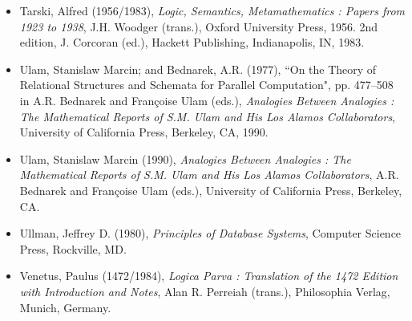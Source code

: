 \documentclass[12pt]{article}
\begin{document}
\begin{itemize}
\item
Tarski, Alfred (1956/1983), \textit{Logic, Semantics, Metamathematics : Papers from 1923 to 1938}, J.H. Woodger (trans.), Oxford University Press, 1956.  2nd edition, J. Corcoran (ed.), Hackett Publishing, Indianapolis, IN, 1983.
\item
Ulam, Stanislaw Marcin; and Bednarek, A.R. (1977), ``On the Theory of Relational Structures and Schemata for Parallel Computation", pp. 477--508 in A.R. Bednarek and Fran\c{c}oise Ulam (eds.), \textit{Analogies Between Analogies : The Mathematical Reports of S.M. Ulam and His Los Alamos Collaborators}, University of California Press, Berkeley, CA, 1990.
\item
Ulam, Stanislaw Marcin (1990), \textit{Analogies Between Analogies : The Mathematical Reports of S.M. Ulam and His Los Alamos Collaborators}, A.R. Bednarek and Fran\c{c}oise Ulam (eds.), University of California Press, Berkeley, CA.
\item
Ullman, Jeffrey D. (1980), \textit{Principles of Database Systems}, Computer Science Press, Rockville, MD.
\item
Venetus, Paulus (1472/1984), \textit{Logica Parva : Translation of the 1472 Edition with Introduction and Notes}, Alan R. Perreiah (trans.), Philosophia Verlag, Munich, Germany.
\end{itemize}

\end{document}
